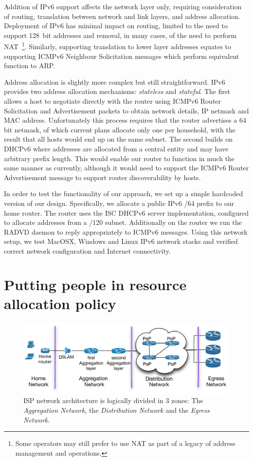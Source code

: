 Addition of IPv6 support affects the network layer only, requiring consideration
of routing, translation between network and link layers, and address
allocation.  Deployment of IPv6 has minimal impact on routing, limited to the
need to support 128~bit addresses and removal, in many cases, of the need to
perform NAT~\footnote{Some operators may still prefer to use NAT as part of a
  legacy of address management and operations.}.  Similarly, supporting
translation to lower layer addresses equates to supporting ICMPv6 Neighbour
Solicitation messages which perform equivalent function to ARP.

Address allocation is slightly more complex but still straightforward.  IPv6
provides two address allocation mechanisms: \emph{stateless} and
\emph{stateful}.  The first allows a host to negotiate directly with the router
using ICMPv6 Router Solicitation and Advertisement packets to obtain network
details, IP netmask and MAC address.  Unfortunately this process requires that
the router advertises a 64 bit netmask, of which current plans allocate only one
per household, with the result that all hosts would end up on the same subnet.
The second builds on DHCPv6 where addresses are allocated from a central entity
and may have arbitrary prefix length.  This would enable our router to function
in much the same manner as currently, although it would need to support the
ICMPv6 Router Advertisement message to support router discoverability by hosts. 

In order to test the functionality of our approach, we set up a simple hardcoded
version of our design. Specifically, we allocate a public IPv6 /64 prefix to our
home router. The router uses the ISC DHCPv6 server implementation, configured to
allocate addresses from a /120 subnet.  Additionally on the router we run the
RADVD daemon to reply appropriately to ICMPv6 messages.  Using this network
setup, we test MacOSX, Windows and Linux IPv6 network stacks and verified
correct network configuration and Internet connectivity. 


\section{Putting people in resource allocation policy} \label{s:qos}

\begin{figure}
  \centering
  \includegraphics[width=0.95\columnwidth]{isp_plan}
  \caption[ISP network architecture]{\label{fig:isp_plan} ISP network architecture is logically divided in 3
    zones: The {\it Aggregation Network}, the {\it Distribution Network}\/ and
    the {\it Egress Network}.}
\end{figure}

